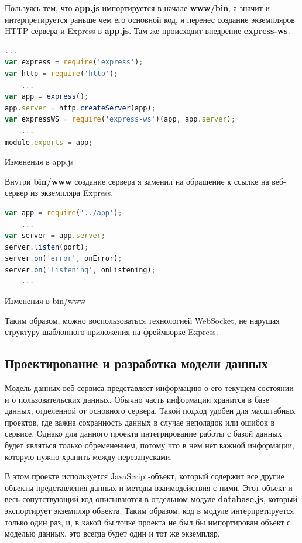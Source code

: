 Пользуясь тем, что \textbf{app.js} импортируется в начале \textbf{www/bin}, а значит и интерпретируется раньше чем его основной код, я перенес создание экземпляров HTTP-сервера и Express в \textbf{app.js}. Там же происходит внедрение \textbf{express-ws}.
\begin{ListingEnv}[H]
\begin{lstlisting}[language=JavaScript]
	...
var express = require('express');
var http = require('http');
	...
var app = express();
app.server = http.createServer(app); 
var expressWS = require('express-ws')(app, app.server);
	...
module.exports = app;
\end{lstlisting}
\caption{Изменения в app.js}
\label{list:appjs-ws}
\end{ListingEnv}  
Внутри \textbf{bin/www} создание сервера я заменил на обращение к ссылке на веб-сервер из экземпляра Express.
\begin{ListingEnv}[H]
\begin{lstlisting}[language=JavaScript]
var app = require('../app');
	...
var server = app.server;
server.listen(port);
server.on('error', onError);
server.on('listening', onListening);
	...
\end{lstlisting}
\caption{Изменения в bin/www}
\label{list:www-ws}
\end{ListingEnv}
Таким образом, можно воспользоваться технологией WebSocket, не нарушая структуру шаблонного приложения на фреймворке Express. 

\subsection{Проектирование и разработка модели данных}
Модель данных веб-сервиса представляет информацию о его текущем состоянии и о пользовательских данных. Обычно часть информации хранится в базе данных, отделенной от основного сервера. Такой подход удобен для масштабных проектов, где важна сохранность данных в случае неполадок или ошибок в сервисе. Однако для данного проекта интегрирование работы с базой данных будет являться только обременением, потому что в нем нет важной информации, которую нужно хранить между перезапусками.

В этом проекте используется JavaScript-объект, который содержит все другие объекты-представления данных и методы взаимодействия с ними. Этот объект и весь сопутствующий код описываются в отдельном модуле \textbf{database.js}, который экспортирует экземпляр объекта. Таким образом, код в модуле интерпретируется только один раз, и, в какой бы точке проекта не был бы импортирован объект с моделью данных, это всегда будет один и тот же экземпляр.

